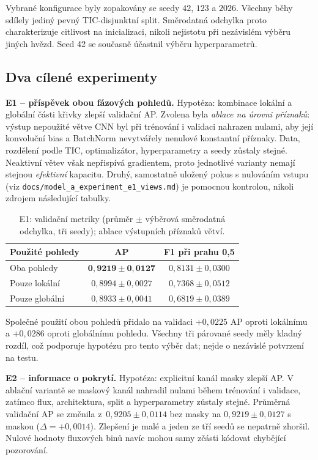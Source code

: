 \documentclass[11pt,a4paper]{article}
\newcommand{\code}[1]{\texttt{#1}}
\begin{document}
Vybrané konfigurace byly zopakovány se seedy $42$, $123$ a $2026$. Všechny běhy sdílely jediný pevný TIC-disjunktní split. Směrodatná odchylka proto charakterizuje citlivost na inicializaci, nikoli nejistotu při nezávislém výběru jiných hvězd. Seed 42 se současně účastnil výběru hyperparametrů.

\subsection{Dva cílené experimenty}
\textbf{E1 -- příspěvek obou fázových pohledů.} Hypotéza: kombinace lokální a globální části křivky zlepší validační AP. Zvolena byla \emph{ablace na úrovni příznaků}: výstup nepoužité větve CNN byl při trénování i validaci nahrazen nulami, aby její konvoluční bias a BatchNorm nevytvářely nenulové konstantní příznaky. Data, rozdělení podle TIC, optimalizátor, hyperparametry a seedy zůstaly stejné. Neaktivní větev však nepřispívá gradientem, proto jednotlivé varianty nemají stejnou \emph{efektivní} kapacitu. Druhý, samostatně uložený pokus s nulováním vstupu (viz \code{docs/model\_a\_experiment\_e1\_views.md}) je pomocnou kontrolou, nikoli zdrojem následující tabulky.

\begin{table}[H]
\centering\small
\caption{E1: validační metriky (průměr $\pm$ výběrová směrodatná odchylka, tři seedy); ablace výstupních příznaků větví.}
\label{tab:e1}
\begin{tabular}{lcc}
\toprule
Použité pohledy & AP & F1 při prahu 0,5 \\
\midrule
Oba pohledy & $\mathbf{0{,}9219\pm0{,}0127}$ & $0{,}8131\pm0{,}0300$ \\
Pouze lokální & $0{,}8994\pm0{,}0027$ & $0{,}7368\pm0{,}0512$ \\
Pouze globální & $0{,}8933\pm0{,}0041$ & $0{,}6819\pm0{,}0389$ \\
\bottomrule
\end{tabular}
\end{table}

Společné použití obou pohledů přidalo na validaci $+0{,}0225$ AP oproti lokálnímu a $+0{,}0286$ oproti globálnímu pohledu. Všechny tři párované seedy měly kladný rozdíl, což podporuje hypotézu pro tento výběr dat; nejde o nezávislé potvrzení na testu.

\textbf{E2 -- informace o pokrytí.} Hypotéza: explicitní kanál masky zlepší AP. V ablační variantě se maskový kanál nahradil nulami během trénování i validace, zatímco flux, architektura, split a hyperparametry zůstaly stejné. Průměrná validační AP se změnila z~$0{,}9205\pm0{,}0114$ bez masky na $0{,}9219\pm0{,}0127$ s maskou ($\Delta=+0{,}0014$). Zlepšení je malé a jeden ze tří seedů se nepatrně zhoršil. Nulové hodnoty fluxových binů navíc mohou samy zčásti kódovat chybějící pozorování.
\end{document}

